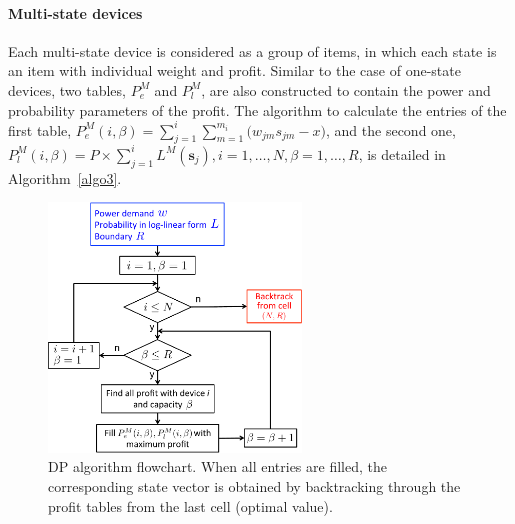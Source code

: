 \paragraph*{Multi-state devices}

Each multi-state device is considered as a group of items, in which each state is an item with individual weight and profit. Similar to the case of one-state devices, two tables, $P^M_e$ and $P^M_l$, are also constructed to contain the power and probability parameters of the profit. The algorithm to calculate the entries of the first table, $P^M_e(i,\beta)=\sum_{j=1}^i{\sum_{m=1}^{m_i}{(w_{jm}s_{jm}}-x)}$, and the second one, $P^M_l(i,\beta)=P\times \sum_{j=1}^i{L^M(\mathbf{s}_j)},i=1,\ldots,N,\beta=1,\ldots,R$, is detailed in Algorithm~\ref{algo3}. 

\begin{figure}[h]
\centering
\includegraphics[width=0.6\textwidth]{./chapters/chapter4/images/DPschema.pdf} 
\caption{DP algorithm flowchart. When all entries are filled, the corresponding state vector is obtained by backtracking through the profit tables from the last cell (optimal value).} 
\label{fig:DP1} 
\end{figure}

